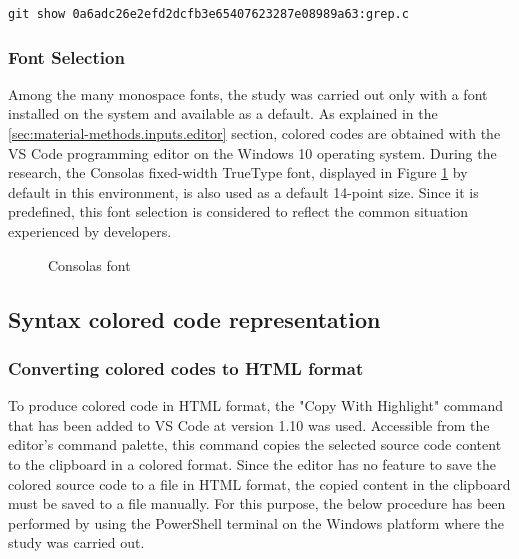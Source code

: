 \documentclass{article}
\begin{document}
\begin{verbatim}
git show 0a6adc26e2efd2dcfb3e65407623287e08989a63:grep.c
\end{verbatim}

\subsubsection{Font Selection} \label{sec:material-methods.inputs.font}
	
Among the many monospace fonts, the study was carried out only with a font installed on the system and available as a default. As explained in the \ref{sec:material-methods.inputs.editor} section, colored codes are obtained with the VS Code programming editor on the Windows 10 operating system.
During the research, the Consolas\cite{microsoft2022consolas} fixed-width TrueType font,  displayed in Figure \ref{fig:consolas} by default in this environment, is also used as a default 14-point size. Since it is predefined, this font selection is considered to reflect the common situation experienced by developers.

\begin{figure}[h]
  \centering
  
  \caption{Consolas font}
  \label{fig:consolas}
\end{figure}

\subsection{Syntax colored code representation}

\subsubsection{Converting colored codes to HTML format}

To produce colored code in HTML format, the "Copy With Highlight" command that has been added to VS Code at version 1.10 was used. Accessible from the editor's command palette, this command copies the selected source code content to the clipboard in a colored format. Since the editor has no feature to save the colored source code to a file in HTML format, the copied content in the clipboard must be saved to a file manually. For this purpose, the below procedure has been performed by using the PowerShell terminal on the Windows platform where the study was carried out.
\end{document}

